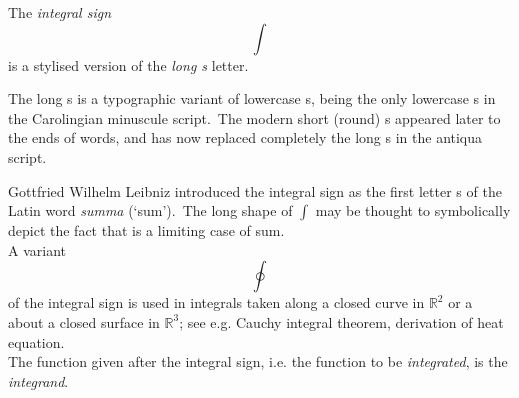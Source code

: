 \documentclass[12pt]{article}
\theoremstyle{definition}
\begin{document}
The {\em integral sign}
                               $$\int$$
is a stylised version of the {\em long s} letter.

The long s is a typographic variant of lowercase s, being the only lowercase s in the Carolingian minuscule script.\, The modern short (round) s appeared later to the ends of words, and has now replaced completely the long s in the antiqua script.

Gottfried Wilhelm Leibniz introduced the integral sign as the first letter s of the Latin word {\em summa} (`sum').\, The long shape of $\displaystyle\int$ may be thought to symbolically depict the fact that  is a limiting case of sum.\\

A variant 
$$\oint$$
of the integral sign is used in integrals taken along a closed curve in $\mathbb{R}^2$ or a about a closed surface in $\mathbb{R}^3$; see e.g. Cauchy integral theorem, derivation of heat equation.\\

The function given after the integral sign, i.e. the function to be {\em integrated}, is the {\em integrand}.
\end{document}

